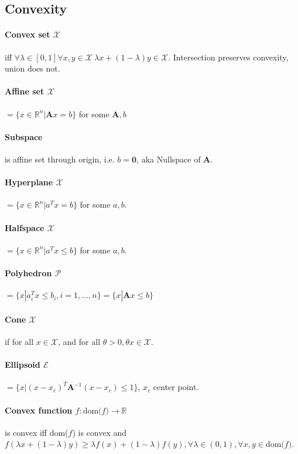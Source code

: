 \documentclass[landscape,a4paper,8pt]{scrartcl}
\newcommand{\mc}[1]{\mathcal{#1}}
\newcommand{\R}{\mathbb R}
\newcommand\vA{\bm{A}}
\begin{document}
\begin{multicols*}{3}
\subsection{Convexity}
\paragraph{Convex set $\mc X$} iff $\forall \lambda \in [0, 1] \forall x, y \in \mc X\ \lambda x + (1-\lambda) y \in \mc X$.
Intersection preserves convexity, union does not.
\paragraph{Affine set $\mc X$} $= \{ x \in \R^n | \vA x = b \}$ for some $\vA,b$
\paragraph{Subspace} is affine set through origin, i.e. $b = \bm 0$, aka Nullspace of $\vA$.
\paragraph{Hyperplane $\mc X$} $= \{ x \in \R^n | a^T x = b \}$ for some $a, b$.
\paragraph{Halfspace $\mc X$} $= \{ x \in \R^n | a^T x \leq b \}$ for some $a, b$.
\paragraph{Polyhedron $\mc P$} $= \{ x | a_i^Tx \leq b_i, i = 1, \dots, n \} = \{ x | \vA x \leq b \}$
\paragraph{Cone $\mc X$} if for all $ x \in \mc X $, and for all $\theta > 0, \theta x \in \mc X$.
\paragraph{Ellipsoid $\mc E$} $= \{ x | (x-x_c)^T\vA^{-1}(x-x_c) \leq 1 \}$, $x_c$ center point.
\paragraph{Convex function $f : \text{dom($f$)} \rightarrow \R$} is convex iff dom($f$) is convex and
$f (\lambda x + (1 - \lambda)y) \geq \lambda f(x) + (1-\lambda)f(y), \forall \lambda \in (0, 1), \forall x, y \in \text{dom($f$)}$.

\end{multicols*}
\end{document}
